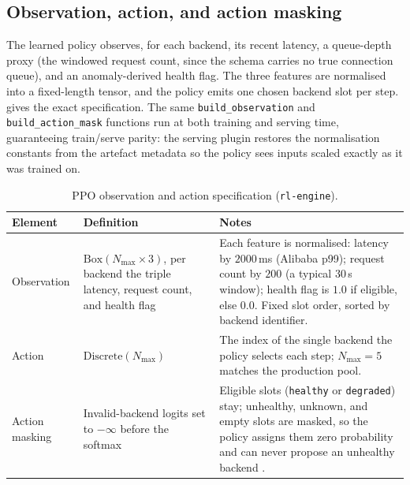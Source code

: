 \subsection{Observation, action, and action masking}\label{imb:ppo_spec}

The learned policy observes, for each backend, its recent latency, a queue-depth
proxy (the windowed request count, since the schema carries no true connection
queue), and an anomaly-derived health flag. The three features are normalised into
a fixed-length tensor, and the policy emits one chosen backend slot per step.
 gives the exact specification. The same
\texttt{build\_observation} and \texttt{build\_action\_mask} functions run at both
training and serving time, guaranteeing train/serve parity: the serving plugin
restores the normalisation constants from the artefact metadata so the policy sees
inputs scaled exactly as it was trained on.

\begin{table}[H]
  \centering
  \caption[PPO observation and action specification]{PPO observation and action specification (\texttt{rl-engine}).}
  \label{tab:imb:ppo_spec}
  \small
  \begin{tabularx}{\linewidth}{@{}p{2.5cm}p{3.5cm}Y@{}}
    \toprule
    \headrow
    \textbf{Element} & \textbf{Definition} & \textbf{Notes} \\
    \midrule
    Observation & $\mathrm{Box}(N_{\max}\!\times\!3)$, per backend the triple
      latency, request count, and health flag
      & Each feature is normalised: latency by $2000$\,ms (Alibaba p99); request
        count by $200$ (a typical 30\,s window); health flag is $1.0$ if eligible,
        else $0.0$. Fixed slot order, sorted by backend identifier. \\
    \addlinespace
    Action & $\mathrm{Discrete}(N_{\max})$
      & The index of the single backend the policy selects each step;
        $N_{\max}=5$ matches the production pool. \\
    \addlinespace
    Action masking & Invalid-backend logits set to $-\infty$ before the softmax
      & Eligible slots (\texttt{healthy} or \texttt{degraded}) stay; unhealthy,
        unknown, and empty slots are masked, so the policy assigns them zero
        probability and can never propose an unhealthy backend
        \cite{schulman2017ppo, raffin2021sb3}. \\
    \bottomrule
  \end{tabularx}
\end{table}


